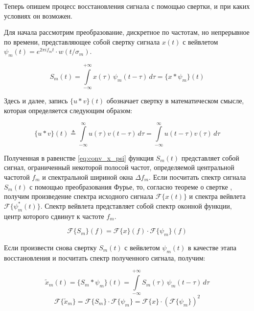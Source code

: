 Теперь опишем процесс восстановления сигнала с помощью свертки, и при каких условиях он возможен.

Для начала рассмотрим преобразование, дискретное по частотам, но непрерывное по времени, 
представляющее собой свертку сигнала $x(t)$ с вейвлетом $\psi_m(t) = e^{2\pi i f_m t} \cdot w(t / \sigma_m)$.

\begin{equation}
  S_m(t)=\int \limits _{-\infty}^{+\infty}x(\tau)\,\psi_m(t - \tau)\,d\tau = \{x * \psi_m\}(t)
  \label{eq:conv_x_psi}
\end{equation}

Здесь и далее, запись $\{u*v\}(t)$ обозначает свертку в математическом смысле, которая определяется следующим образом:

\begin{equation}
  \{u*v\}(t)\triangleq \int \limits_{-\infty }^{\infty }u(\tau )v(t-\tau )\,d\tau = \int \limits_{-\infty }^{\infty }u(t-\tau )v(\tau )\,d\tau
\end{equation}

Полученная в равенстве \ref{eq:conv_x_psi} функция $S_m(t)$ представляет собой сигнал, ограниченный некоторой полосой частот, 
определяемой центральной частотой $f_m$ и спектральной шириной окна $\Delta f_m$.
Если посчитать спектр сигнала $S_m(t)$ с помощью преобразования Фурье, то, согласно теореме о свертке \cite{conv_theorem}, 
получим произведение спектра исходного сигнала $\mathcal{F}\{x(t)\}$ и спектра вейвлета $\mathcal{F}\{\psi_m^{*}(t)\}$.
Спектр вейвлета представляет собой спектр оконной функции, центр которого сдвинут к частоте $f_m$.

\begin{equation}
  \mathcal{F}\{S_m\}(f) = \mathcal{F}\{x\}(f) \cdot \mathcal{F}\{\psi_m\}(f)
\end{equation}

Если произвести снова свертку $S_m(t)$ с вейвлетом $\psi_m(t)$ в качестве этапа восстановления и посчитать спектр полученного сигнала, получим:

\begin{equation}
  \tilde{x}_m(t) = \{S_m * \psi_m\}(t) = \int \limits _{-\infty}^{+\infty} S_m(\tau)\,\psi_m(t - \tau)\,d\tau
\end{equation}
\begin{equation}
  \mathcal{F}\{\tilde{x}_m\} = \mathcal{F}\{S_m\} \cdot \mathcal{F}\{\psi_m\} = \mathcal{F}\{x\} \cdot (\mathcal{F}\{\psi_m\})^2
\end{equation}

